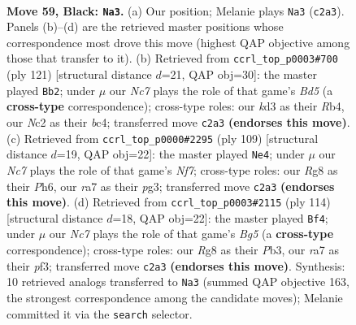 \documentclass[11pt]{article}
\begin{document}
\clearpage

\begin{figure}[p]\centering
\begin{subfigure}{0.46\textwidth}\centering
\resizebox{\linewidth}{!}{%
\newchessgame
\chessboard[
  setfen={6r1/R7/Pp1k4/1B3p2/5P2/3K4/2n5/8 b - - 2 59},
  showmover=false,
  pgfstyle=straightmove, color=movearrow, markmove={c2-a3}
]}
\caption{}
\end{subfigure}\hfill
\begin{subfigure}{0.46\textwidth}\centering
\resizebox{\linewidth}{!}{%
\newchessgame
\chessboard[
  setfen={8/5R2/3k4/8/prBb4/3K1P2/P7/8 b - - 1 61},
  showmover=false,
  pgfstyle=straightmove, color=movearrow, markmove={d4-b2}
]}
\caption{}
\end{subfigure}
\\[4pt]
\begin{subfigure}{0.46\textwidth}\centering
\resizebox{\linewidth}{!}{%
\newchessgame
\chessboard[
  setfen={8/8/7p/p3k3/8/1P4P1/4Kn1P/3B4 b - - 21 55},
  showmover=false,
  pgfstyle=straightmove, color=movearrow, markmove={f2-e4}
]}
\caption{}
\end{subfigure}\hfill
\begin{subfigure}{0.46\textwidth}\centering
\resizebox{\linewidth}{!}{%
\newchessgame
\chessboard[
  setfen={8/8/p5k1/P5B1/4b3/1P3pP1/8/6K1 w - - 1 58},
  showmover=false,
  pgfstyle=straightmove, color=movearrow, markmove={g5-f4}
]}
\caption{}
\end{subfigure}
\caption{\textbf{Move 59, Black: \texttt{Na3}.} (a) Our position; Melanie plays \texttt{Na3} (\texttt{c2a3}). Panels (b)--(d) are the retrieved master positions whose correspondence most drove this move (highest QAP objective among those that transfer to it). (b) Retrieved from \texttt{ccrl\_top\_p0003\#700} (ply 121) [structural distance $d$=21, QAP obj=30]: the master played \texttt{Bb2}; under $\mu$ our \emph{Nc7} plays the role of that game's \emph{Bd5} (a \textbf{cross-type} correspondence); cross-type roles: our \emph{k}d3 as their \emph{R}b4, our \emph{N}c2 as their \emph{b}c4; transferred move \texttt{c2a3} \textbf{(endorses this move)}. (c) Retrieved from \texttt{ccrl\_top\_p0000\#2295} (ply 109) [structural distance $d$=19, QAP obj=22]: the master played \texttt{Ne4}; under $\mu$ our \emph{Nc7} plays the role of that game's \emph{Nf7}; cross-type roles: our \emph{R}g8 as their \emph{P}h6, our \emph{r}a7 as their \emph{p}g3; transferred move \texttt{c2a3} \textbf{(endorses this move)}. (d) Retrieved from \texttt{ccrl\_top\_p0003\#2115} (ply 114) [structural distance $d$=18, QAP obj=22]: the master played \texttt{Bf4}; under $\mu$ our \emph{Nc7} plays the role of that game's \emph{Bg5} (a \textbf{cross-type} correspondence); cross-type roles: our \emph{R}g8 as their \emph{P}b3, our \emph{r}a7 as their \emph{p}f3; transferred move \texttt{c2a3} \textbf{(endorses this move)}. Synthesis: 10 retrieved analogs transferred to \texttt{Na3} (summed QAP objective 163, the strongest correspondence among the candidate moves); Melanie committed it via the \texttt{search} selector.}
\label{fig:thought-m117}
\end{figure}
\end{document}
